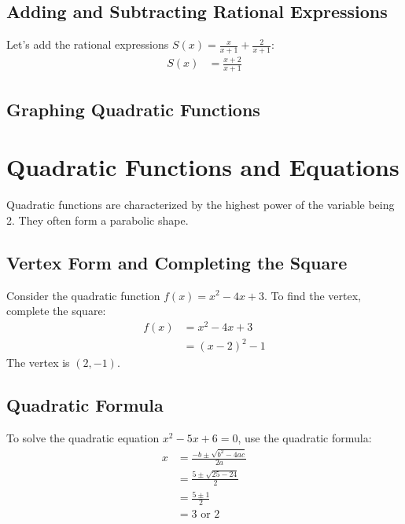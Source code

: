 \documentclass{article}
\begin{document}
\subsection{Adding and Subtracting Rational Expressions}
Let's add the rational expressions $S(x) = \frac{x}{x + 1} + \frac{2}{x + 1}$:
\begin{align*}
    S(x) &= \frac{x + 2}{x + 1}
\end{align*}

\subsection{Graphing Quadratic Functions}

\section{Quadratic Functions and Equations}
Quadratic functions are characterized by the highest power of the variable being 2. They often form a parabolic shape.

\subsection{Vertex Form and Completing the Square}
Consider the quadratic function $f(x) = x^2 - 4x + 3$. To find the vertex, complete the square:
\begin{align*}
    f(x) &= x^2 - 4x + 3 \\
    &= (x - 2)^2 - 1
\end{align*}
The vertex is $(2, -1)$.

\subsection{Quadratic Formula}
To solve the quadratic equation $x^2 - 5x + 6 = 0$, use the quadratic formula:
\begin{align*}
    x &= \frac{-b \pm \sqrt{b^2 - 4ac}}{2a} \\
    &= \frac{5 \pm \sqrt{25 - 24}}{2} \\
    &= \frac{5 \pm 1}{2} \\
    &= 3 \text{ or } 2
\end{align*}
\end{document}
